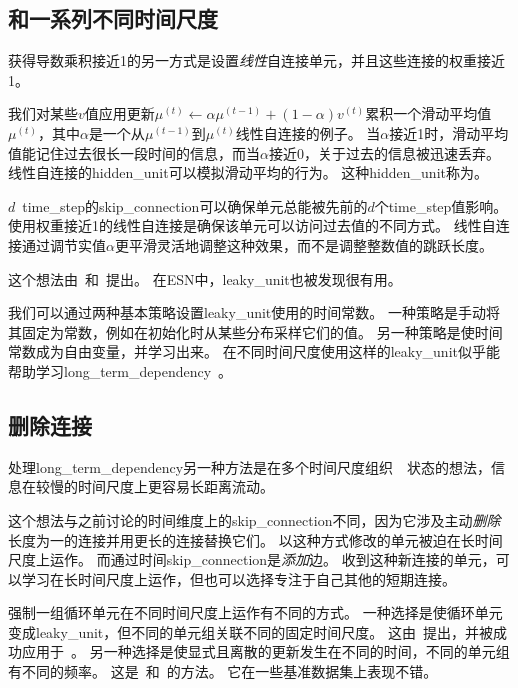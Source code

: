 
\subsection{和一系列不同时间尺度}
\label{sec:leaky_units_and_a_spectrum_of_different_time_scales}
获得导数乘积接近1的另一方式是设置\emph{线性}自连接单元，并且这些连接的权重接近1。

我们对某些$v$值应用更新$\mu^{(t)} \gets \alpha \mu^{(t-1)} + (1-\alpha) v^{(t)}$累积一个滑动平均值$\mu^{(t)}$，其中$\alpha$是一个从$ \mu^{(t-1)}$到$ \mu^{(t)}$线性自连接的例子。
当$\alpha$接近1时，滑动平均值能记住过去很长一段时间的信息，而当$\alpha$接近0，关于过去的信息被迅速丢弃。
线性自连接的\gls{hidden_unit}可以模拟滑动平均的行为。
这种\gls{hidden_unit}称为。

$d$~\gls{time_step}的\gls{skip_connection}可以确保单元总能被先前的$d$个\gls{time_step}值影响。
使用权重接近1的线性自连接是确保该单元可以访问过去值的不同方式。
线性自连接通过调节实值$\alpha$更平滑灵活地调整这种效果，而不是调整整数值的跳跃长度。

这个想法由~\cite{Mozer-nips92}和~\cite{ElHihi+Bengio-nips8}提出。
在\gls{ESN}中，\gls{leaky_unit}也被发现很有用\citep{JaegerLPS07}。

我们可以通过两种基本策略设置\gls{leaky_unit}使用的时间常数。
一种策略是手动将其固定为常数，例如在初始化时从某些分布采样它们的值。
另一种策略是使时间常数成为自由变量，并学习出来。
在不同时间尺度使用这样的\gls{leaky_unit}似乎能帮助学习\gls{long_term_dependency}~\citep{Mozer-nips92,Pascanu+al-ICML2013-small}。

\subsection{删除连接}
\label{sec:removing_connections}
处理\gls{long_term_dependency}另一种方法是在多个时间尺度组织~~状态的想法\citep{ElHihi+Bengio-nips8}，信息在较慢的时间尺度上更容易长距离流动。

这个想法与之前讨论的时间维度上的\gls{skip_connection}不同，因为它涉及主动\emph{删除}长度为一的连接并用更长的连接替换它们。
以这种方式修改的单元被迫在长时间尺度上运作。
而通过时间\gls{skip_connection}是\emph{添加}边。
收到这种新连接的单元，可以学习在长时间尺度上运作，但也可以选择专注于自己其他的短期连接。


强制一组循环单元在不同时间尺度上运作有不同的方式。
一种选择是使循环单元变成\gls{leaky_unit}，但不同的单元组关联不同的固定时间尺度。
这由~\cite{Mozer-nips92}提出，并被成功应用于~\cite{Pascanu+al-ICML2013-small}。
另一种选择是使显式且离散的更新发生在不同的时间，不同的单元组有不同的频率。
这是~\cite{ElHihi+Bengio-nips8}和~\cite{Koutnik-et-al-ICML2014}的方法。
它在一些基准数据集上表现不错。

